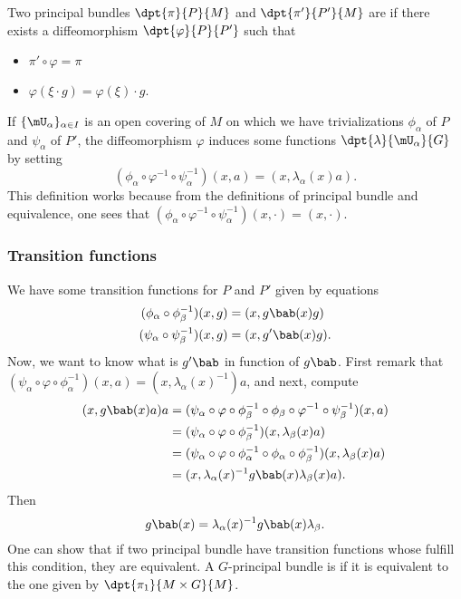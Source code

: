 Two principal bundles $\dpt{\pi}{P}{M}$ and $\dpt{\pi'}{P'}{M}$ are  if there exists a diffeomorphism $\dpt{\varphi}{P}{P'}$ such that 

\begin{itemize}
\item  $\pi'\circ\varphi=\pi$
\item $\varphi(\xi\cdot g)=\varphi(\xi)\cdot g$.
\end{itemize}

If $\{\mU_{\alpha}\}_{\alpha\in I}$ is an open covering of $M$ on which we have trivializations $\phi_{\alpha}$ of $P$ and $\psi_{\alpha}$ of $P'$, the diffeomorphism $\varphi$ induces some functions $\dpt{\lambda}{\mU_{\alpha}}{G}$ by setting
\[
   (\phi_{\alpha}\circ\varphi^{-1}\circ\psi_{\alpha}^{-1})(x,a)=(x,\lambda_{\alpha}(x)a).
\]
This definition works because from the definitions of principal bundle and equivalence, one sees that $(\phi_{\alpha}\circ\varphi^{-1}\circ\psi_{\alpha}^{-1})(x,\cdot)=(x,\cdot)$.

\subsubsection{Transition functions}

We have some transition functions for $P$ and $P'$ given by equations
\[
 \begin{aligned}
   (\phi_{\alpha}\circ\phi_{\beta}^{-1})(x,g)&=(x,g\bab(x)g)\\
   (\psi_{\alpha}\circ\psi_{\beta}^{-1})(x,g)&=(x,g'\bab(x)g).
 \end{aligned}
\]
Now, we want to know what is $g'\bab$ in function of $g\bab$. First remark that $(\psi_{\alpha}\circ\varphi\circ\phi_{\alpha}^{-1})(x,a)=(x,\lambda_{\alpha}(x)^{-1})a$, and next, compute
\begin{equation}
\begin{split}
  (x,g\bab(x)a)a&=(\psi_{\alpha}\circ\varphi\circ\phi_{\beta}^{-1}\circ\phi_{\beta}\circ\varphi^{-1}\circ\psi_{\beta}^{-1})(x,a)\\
                &=(\psi_{\alpha}\circ\varphi\circ\phi_{\beta}^{-1})(x,\lambda_{\beta}(x)a)\\
		&=(\psi_{\alpha}\circ\varphi\circ\phi_{\alpha}^{-1}\circ\phi_{\alpha}\circ\phi_{\beta}^{-1})(x,\lambda_{\beta}(x)a)\\
		&=(x,\lambda_{\alpha}(x)^{-1} g\bab(x)\lambda_{\beta}(x)a).
\end{split}
\end{equation}
Then 
\begin{equation}
    g\bab(x)=\lambda_{\alpha}(x)^{-1} g\bab(x)\lambda_{\beta}.
\end{equation}
One can show that if two principal bundle have transition functions whose fulfill this condition, they are equivalent. A $G$-principal bundle is  if it is equivalent to the one given by $\dpt{\pi_1}{M\times G}{M}$.

